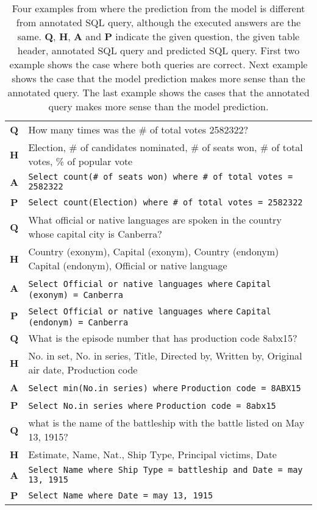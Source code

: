 \documentclass[11pt,a4paper]{article}
\begin{document}
\begin{table*}[!tb]
    \centering \small
\begin{tabulary}{\textwidth}{cl} 
        \toprule
            \textbf{Q} & How many times was the \# of total votes 2582322? \\
            \textbf{H} & Election, \# of candidates nominated, \# of seats won, \# of total votes, \% of popular vote \\
            \textbf{A} & \texttt{Select count(\# of seats won) where \# of total votes = 2582322} \\
            \textbf{P} & \texttt{Select count(Election) where \# of total votes = 2582322} \\
        \midrule
            \textbf{Q} & What official or native languages are spoken in the country whose capital city is Canberra? \\
            \textbf{H} & Country (exonym), Capital (exonym), Country (endonym) Capital (endonym), Official or native language \\
            \textbf{A} & \texttt{Select Official or native languages where} \texttt{Capital (exonym) = Canberra} \\
            \textbf{P} & \texttt{Select Official or native languages where} \texttt{Capital (endonym) = Canberra} \\
        \midrule
            \textbf{Q} & What is the episode number that has production code 8abx15? \\
            \textbf{H} & No. in set, No. in series, Title, Directed by, Written by, Original air date, Production code \\
            \textbf{A} & \texttt{Select min(No.in series) where} \texttt{Production code = 8ABX15} \\
            \textbf{P} & \texttt{Select No.in series where} \texttt{Production code = 8abx15}  \\
        \midrule
            \textbf{Q} & what is the name of the battleship with the battle listed on May 13, 1915? \\
            \textbf{H} & Estimate, Name, Nat., Ship Type, Principal victims, Date \\
            \textbf{A} & \texttt{Select Name where Ship Type = battleship and Date = may 13, 1915} \\
            \textbf{P} & \texttt{Select Name where Date = may 13, 1915} \\
        \bottomrule
    \end{tabulary}
    \caption{
        Four examples from \wikisql{} where the prediction from the model is different from annotated SQL query, although the executed answers are the same. \textbf{Q}, \textbf{H}, \textbf{A} and \textbf{P} indicate the given question, the given table header, annotated SQL query and predicted SQL query. First two example shows the case where both queries are correct. Next example shows the case that the model prediction makes more sense than the annotated query. The last example shows the cases that the annotated query makes  more sense than the model prediction.
    }
    \label{tab:wikisql-examples}
\vspace{-8pt}
\end{table*}
\end{document}
